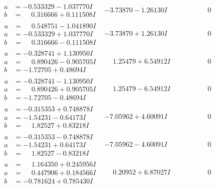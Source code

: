 \documentclass[1p]{elsarticle_modified}
\theoremstyle{definition}
\begin{document}
$$\begin{array}{c|c|c}
\begin{aligned}
a &= -0.533329 - 1.037770 I \\
b &= \phantom{-}0.316666 + 0.111508 I\end{aligned}
 & -3.73870 - 1.26130 I & \phantom{-0.000000 } 0 \\ \hline\begin{aligned}
u &= \phantom{-}0.548751 - 1.041890 I \\
a &= -0.533329 + 1.037770 I \\
b &= \phantom{-}0.316666 - 0.111508 I\end{aligned}
 & -3.73870 + 1.26130 I & \phantom{-0.000000 } 0 \\ \hline\begin{aligned}
u &= -0.328741 + 1.130950 I \\
a &= \phantom{-}0.890426 - 0.905705 I \\
b &= -1.72705 + 0.48694 I\end{aligned}
 & \phantom{-}1.25479 + 6.54912 I & \phantom{-0.000000 } 0 \\ \hline\begin{aligned}
u &= -0.328741 - 1.130950 I \\
a &= \phantom{-}0.890426 + 0.905705 I \\
b &= -1.72705 - 0.48694 I\end{aligned}
 & \phantom{-}1.25479 - 6.54912 I & \phantom{-0.000000 } 0 \\ \hline\begin{aligned}
u &= -0.315353 + 0.748878 I \\
a &= -1.54231 - 0.64173 I \\
b &= \phantom{-}1.82527 + 0.83218 I\end{aligned}
 & -7.05962 + 4.60091 I & \phantom{-0.000000 } 0 \\ \hline\begin{aligned}
u &= -0.315353 - 0.748878 I \\
a &= -1.54231 + 0.64173 I \\
b &= \phantom{-}1.82527 - 0.83218 I\end{aligned}
 & -7.05962 - 4.60091 I & \phantom{-0.000000 } 0 \\ \hline\begin{aligned}
u &= \phantom{-}1.164350 + 0.245956 I \\
a &= \phantom{-}0.447906 + 0.184566 I \\
b &= -0.781624 + 0.785430 I\end{aligned}
 & \phantom{-}0.20952 + 6.87027 I & \phantom{-0.000000 } 0 \\ \hline\begin{aligned}

\end{aligned}
\end{array}$$
\end{document}
